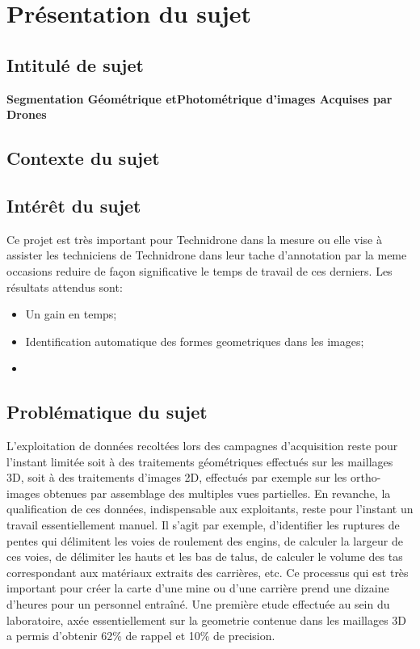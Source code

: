  \section{Présentation du sujet}

\subsection{Intitulé de sujet}

\textbf{Segmentation Géométrique etPhotométrique d’images Acquises par Drones}

 \subsection{Contexte du sujet}



\subsection{Intérêt du sujet}
 
Ce projet est très important pour Technidrone dans la mesure ou elle vise à
assister les techniciens de Technidrone dans leur tache d'annotation par la meme occasions reduire de façon 
significative le temps de travail de ces derniers.
Les résultats attendus sont:
\begin{itemize}
  \item Un gain en temps;
  \item Identification automatique des formes geometriques dans les images;
  \item 
\end{itemize}

    \subsection{Problématique du sujet}

    L’exploitation de données recoltées lors des campagnes d'acquisition reste pour
    l’instant limitée soit à des traitements géométriques effectués sur les maillages 3D,
    soit à des traitements d’images 2D, effectués par exemple sur les ortho-images obtenues
    par assemblage des multiples vues partielles. En revanche, la qualification de
    ces données, indispensable aux exploitants, reste pour l’instant un travail essentiellement manuel.
    Il s’agit par exemple, d’identifier les ruptures de pentes qui délimitent
    les voies de roulement des engins, de calculer la largeur de ces voies, de délimiter
    les hauts et les bas de talus, de calculer le volume des tas correspondant aux matériaux 
    extraits des carrières, etc. Ce processus qui est très important pour créer la
    carte d’une mine ou d’une carrière prend une dizaine d’heures pour un personnel
    entraîné. Une première etude effectuée au sein du laboratoire, axée essentiellement
    sur la geometrie contenue dans les maillages 3D a permis d’obtenir 62\% de rappel
    et 10\% de precision.

